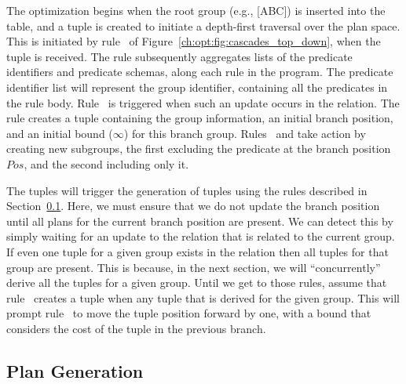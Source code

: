 The optimization begins when the root group (e.g., [ABC]) is inserted into the
 table, and a  tuple is created to initiate a depth-first
traversal over the plan space.  This is initiated by rule~ of
Figure~\ref{ch:opt:fig:cascades_top_down}, when the 
tuple is received.  The rule subsequently aggregates lists of the predicate
identifiers and predicate schemas, along each rule in the program.  The
predicate identifier list will represent the group identifier, containing all
the predicates in the rule body.  Rule~ is triggered when such an
update occurs in the  relation.  The rule creates a  tuple
containing the group information, an initial branch position, and an initial
bound ($\infty$) for this branch group.  Rules~ and  take
action by creating new subgroups, the first excluding the predicate at the
branch position $Pos$, and the second including only it.

The  tuples will trigger the generation of  tuples using
the rules described in Section~\ref{ch:opt:sec:cascades_plan}.  Here, we must
ensure that we do not update the branch position until all plans for the
current branch position are present.  We can detect this by simply waiting for
an update to the  relation that is related to the current 
group.  If even one  tuple for a given group exists in the 
relation then all  tuples for that group are present.  This is
because, in the next section, we will ``concurrently'' derive all the 
tuples for a given group.  Until we get to those rules, assume that
rule~ creates a  tuple when any  tuple that
is derived for the given group.  This will prompt rule~ to move the
 tuple position forward by one, with a bound that considers the cost
of the  tuple in the previous branch.

\subsection{Plan Generation}
\label{ch:opt:sec:cascades_plan}


